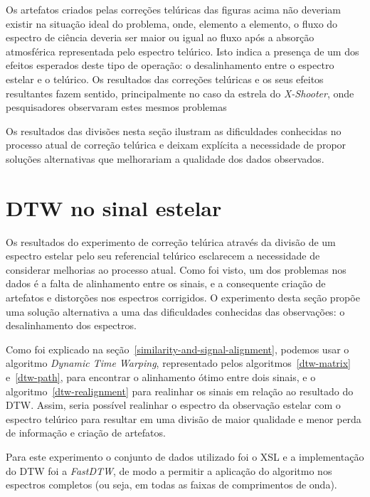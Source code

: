 Os artefatos criados pelas correções telúricas das figuras acima não deveriam existir na situação ideal do problema, onde, elemento a elemento, o fluxo do espectro de ciência deveria ser maior ou igual ao fluxo após a absorção atmosférica representada pelo espectro telúrico. Isto indica a presença de um dos efeitos esperados deste tipo de operação: o desalinhamento entre o espectro estelar e o telúrico. Os resultados das correções telúricas e os seus efeitos resultantes fazem sentido, principalmente no caso da estrela do \textit{X-Shooter}, onde pesquisadores observaram estes mesmos problemas \citep{unpublished-xshooter-data-release, wavelength-shifts}

Os resultados das divisões nesta seção ilustram as dificuldades conhecidas no processo atual de correção telúrica e deixam explícita a necessidade de propor soluções alternativas que melhorariam a qualidade dos dados observados.

\section{DTW no sinal estelar}

Os resultados do experimento de correção telúrica através da divisão de um espectro estelar pelo seu referencial telúrico esclarecem a necessidade de considerar melhorias ao processo atual. Como foi visto, um dos problemas nos dados é a falta de alinhamento entre os sinais, e a consequente criação de artefatos e distorções nos espectros corrigidos. O experimento desta seção propõe uma solução alternativa a uma das dificuldades conhecidas das observações: o desalinhamento dos espectros.

Como foi explicado na seção~\ref{similarity-and-signal-alignment}, podemos usar o algoritmo \textit{Dynamic Time Warping}, representado pelos algoritmos~\ref{dtw-matrix} e~\ref{dtw-path}, para encontrar o alinhamento ótimo entre dois sinais, e o algoritmo~\ref{dtw-realignment} para realinhar os sinais em relação ao resultado do DTW. Assim, seria possível realinhar o espectro da observação estelar com o espectro telúrico para resultar em uma divisão de maior qualidade e menor perda de informação e criação de artefatos. 

Para este experimento o conjunto de dados utilizado foi o XSL e a implementação do DTW foi a \textit{FastDTW}, de modo a permitir a aplicação do algoritmo nos espectros completos (ou seja, em todas as faixas de comprimentos de onda).


